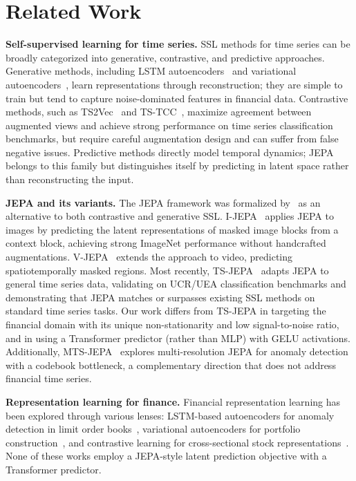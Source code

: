 \documentclass[11pt]{article}
\begin{document}
\section{Related Work}

\textbf{Self-supervised learning for time series.}
SSL methods for time series can be broadly categorized into generative, contrastive, and predictive approaches. Generative methods, including LSTM autoencoders~\citep{srivastava2015unsupervised} and variational autoencoders~\citep{kingma2014vae}, learn representations through reconstruction; they are simple to train but tend to capture noise-dominated features in financial data. Contrastive methods, such as TS2Vec~\citep{yue2022ts2vec} and TS-TCC~\citep{eldele2021tstcc}, maximize agreement between augmented views and achieve strong performance on time series classification benchmarks, but require careful augmentation design and can suffer from false negative issues. Predictive methods directly model temporal dynamics; JEPA belongs to this family but distinguishes itself by predicting in latent space rather than reconstructing the input.

\textbf{JEPA and its variants.}
The JEPA framework was formalized by~\citet{lecun2022path} as an alternative to both contrastive and generative SSL. I-JEPA~\citep{assran2023ijepa} applies JEPA to images by predicting the latent representations of masked image blocks from a context block, achieving strong ImageNet performance without handcrafted augmentations. V-JEPA~\citep{bardes2024vjepa} extends the approach to video, predicting spatiotemporally masked regions. Most recently, TS-JEPA~\citep{ennadir2025tsjepa} adapts JEPA to general time series data, validating on UCR/UEA classification benchmarks and demonstrating that JEPA matches or surpasses existing SSL methods on standard time series tasks. Our work differs from TS-JEPA in targeting the financial domain with its unique non-stationarity and low signal-to-noise ratio, and in using a Transformer predictor (rather than MLP) with GELU activations. Additionally, MTS-JEPA~\citep{he2026mtsjepa} explores multi-resolution JEPA for anomaly detection with a codebook bottleneck, a complementary direction that does not address financial time series.

\textbf{Representation learning for finance.}
Financial representation learning has been explored through various lenses: LSTM-based autoencoders for anomaly detection in limit order books~\citep{lin2021anomaly}, variational autoencoders for portfolio construction~\citep{chen2022vae}, and contrastive learning for cross-sectional stock representations~\citep{sawhney2021contrastive}. None of these works employ a JEPA-style latent prediction objective with a Transformer predictor.
\end{document}
